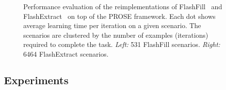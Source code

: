 \begin{figure}[p!]
    \centering
    \caption{Performance evaluation of the reimplementations of FlashFill~\cite{flashfill} and
    FlashExtract~\cite{flashextract} on top of the PROSE framework.
    Each dot shows average learning time per iteration on a given scenario.
    The scenarios are clustered by the number of examples (iterations) required to complete the task.
    \emph{Left:} 531 FlashFill scenarios.
    \emph{Right:} 6464 FlashExtract scenarios.}
    \label{fig:prose:evaluation:perf}
\end{figure}

\subsection{Experiments}
\label{sec:prose:evaluation:experiments}

